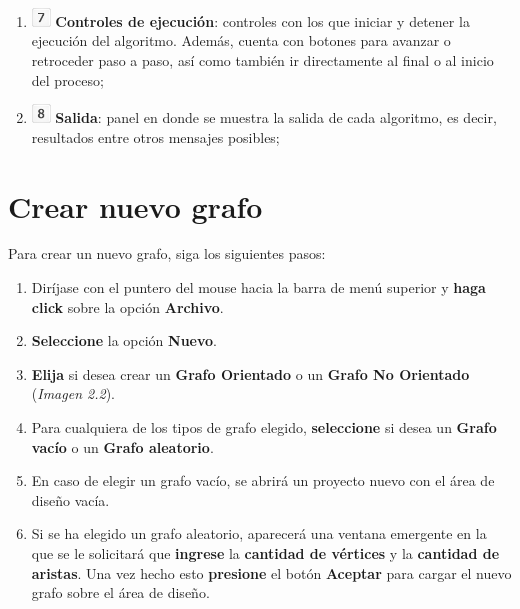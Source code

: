 \documentclass{book}
\begin{document}
\begin{enumerate}
	\item [] \includegraphics[width=0.5cm]{images/number-7.png} \textbf{Controles de ejecución}: controles con los que iniciar y detener la ejecución del algoritmo. Además, cuenta con botones para avanzar o retroceder paso a paso, así como también ir directamente al final o al inicio del proceso;

	\item [] \includegraphics[width=0.5cm]{images/number-8.png} \textbf{Salida}: panel en donde se muestra la salida de cada algoritmo, es decir, resultados entre otros mensajes posibles;

\end{enumerate}
\medskip





\section{Crear nuevo grafo}

Para crear un nuevo grafo, siga los siguientes pasos:
\medskip

\begin{enumerate}
	\itemsep=8pt \topsep=0pt \partopsep=0pt \parskip=0pt \parsep=0pt
	
	\item Diríjase con el puntero del mouse hacia la barra de menú superior y \textbf{haga click} sobre la opción \textbf{Archivo}.

	\item \textbf{Seleccione} la opción \textbf{Nuevo}.

	\item \textbf{Elija} si desea crear un \textbf{Grafo Orientado} o un \textbf{Grafo No Orientado} (\textit{Imagen 2.2}).

	\item Para cualquiera de los tipos de grafo elegido, \textbf{seleccione} si desea un \textbf{Grafo vacío} o un \textbf{Grafo aleatorio}.

	\item  En caso de elegir un grafo vacío, se abrirá un proyecto nuevo con el área de diseño vacía.

	\item Si se ha elegido un grafo aleatorio, aparecerá una ventana emergente en la que se le solicitará que \textbf{ingrese} la \textbf{ cantidad de vértices} y la \textbf{cantidad de aristas}. Una vez hecho esto \textbf{presione} el botón \textbf{Aceptar} para cargar el nuevo grafo sobre el área de diseño.

\end{enumerate}
\smallskip
\end{document}

